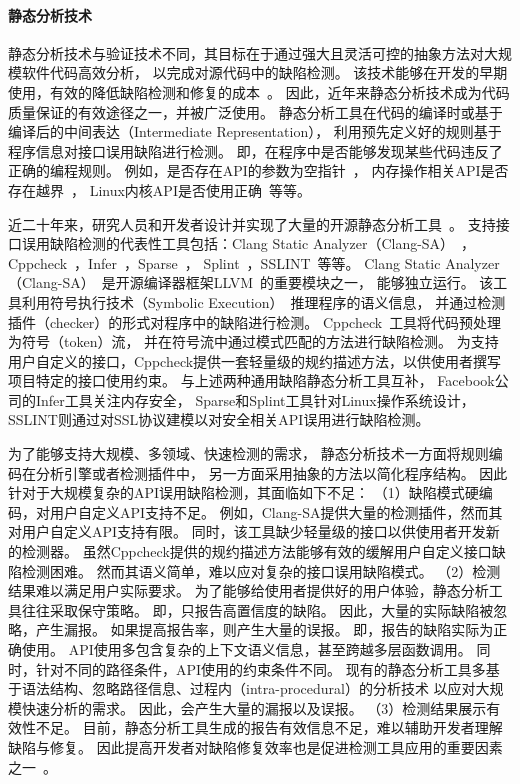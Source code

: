 \paragraph{静态分析技术}
静态分析技术与验证技术不同，其目标在于通过强大且灵活可控的抽象方法对大规模软件代码高效分析，
以完成对源代码中的缺陷检测。
该技术能够在开发的早期使用，有效的降低缺陷检测和修复的成本~\cite{06-cost}。
因此，近年来静态分析技术成为代码质量保证的有效途径之一，并被广泛使用。
静态分析工具在代码的编译时或基于编译后的中间表达（Intermediate Representation），
利用预先定义好的规则基于程序信息对接口误用缺陷进行检测。
即，在程序中是否能够发现某些代码违反了正确的编程规则。
例如，是否存在API的参数为空指针~\cite{00-osdi-npd}，
内存操作相关API是否存在越界~\cite{11-ras-overflow}，
Linux内核API是否使用正确~\cite{09-dsn-linux}等等。

近二十年来，研究人员和开发者设计并实现了大量的开源静态分析工具~\cite{wiki-static-tool}。
支持接口误用缺陷检测的代表性工具包括：Clang Static Analyzer（Clang-SA）~\cite{clang-sa}，
Cppcheck~\cite{cppcheck}，Infer~\cite{infer}，Sparse~\cite{sparse}，
Splint~\cite{splint}，SSLINT~\cite{15-sp-sslint}等等。
Clang Static Analyzer（Clang-SA）~\cite{clang-sa}是开源编译器框架LLVM~\cite{llvm}的重要模块之一，
能够独立运行。
该工具利用符号执行技术（Symbolic Execution）~\cite{13-acm-se}推理程序的语义信息，
并通过检测插件（checker）的形式对程序中的缺陷进行检测。
Cppcheck~\cite{cppcheck}工具将代码预处理为符号（token）流，
并在符号流中通过模式匹配的方法进行缺陷检测。
为支持用户自定义的接口，Cppcheck提供一套轻量级的规约描述方法，以供使用者撰写项目特定的接口使用约束。
与上述两种通用缺陷静态分析工具互补，
Facebook公司的Infer工具关注内存安全，
Sparse和Splint工具针对Linux操作系统设计，
SSLINT则通过对SSL协议建模以对安全相关API误用进行缺陷检测。


为了能够支持大规模、多领域、快速检测的需求，
静态分析技术一方面将规则编码在分析引擎或者检测插件中，
另一方面采用抽象的方法以简化程序结构。
因此针对于大规模复杂的API误用缺陷检测，其面临如下不足：
（1）缺陷模式硬编码，对用户自定义API支持不足。
例如，Clang-SA提供大量的检测插件，然而其对用户自定义API支持有限。
同时，该工具缺少轻量级的接口以供使用者开发新的检测器。
虽然Cppcheck提供的规约描述方法能够有效的缓解用户自定义接口缺陷检测困难。
然而其语义简单，难以应对复杂的接口误用缺陷模式。
（2）检测结果难以满足用户实际要求。
为了能够给使用者提供好的用户体验，静态分析工具往往采取保守策略。
即，只报告高置信度的缺陷。
因此，大量的实际缺陷被忽略，产生漏报。
如果提高报告率，则产生大量的误报。
即，报告的缺陷实际为正确使用。
API使用多包含复杂的上下文语义信息，甚至跨越多层函数调用。
同时，针对不同的路径条件，API使用的约束条件不同。
现有的静态分析工具多基于语法结构、忽略路径信息、过程内（intra-procedural）的分析技术
以应对大规模快速分析的需求。
因此，会产生大量的漏报以及误报。
（3）检测结果展示有效性不足。
目前，静态分析工具生成的报告有效信息不足，难以辅助开发者理解缺陷与修复。
因此提高开发者对缺陷修复效率也是促进检测工具应用的重要因素之一~\cite{13-icse-donotuse}。

